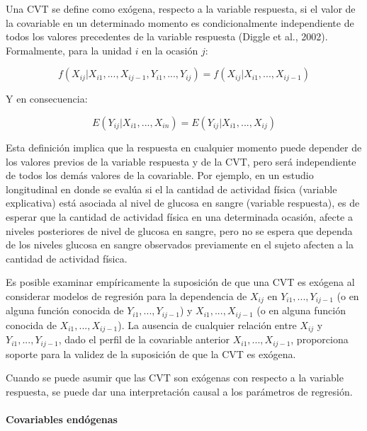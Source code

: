 \documentclass[spanish]{article}
\numberwithin{figure}{subsection}
\numberwithin{equation}{subsection}
\numberwithin{table}{subsection}
\begin{document}
Una CVT se define como exógena, respecto a la variable respuesta, si el valor de
la covariable en un determinado momento es condicionalmente independiente de
todos los valores precedentes de la variable respuesta (Diggle et al., 2002).
Formalmente, para la unidad $i$ en la ocasión $j$:  

\begin{equation}
	\label{exogeneidad}
	f(X_{ij}|X_{i1}, ..., X_{ij-1}, Y_{i1}, ..., Y_{ij}) =
	f(X_{ij}|X_{i1}, ..., X_{ij-1})
\end{equation}

Y en consecuencia:

\begin{equation}
	\label{exogeneidad debil}
	E(Y_{ij}|X_{i1}, ..., X_{in}) = E(Y_{ij}|X_{i1}, ..., X_{ij})
\end{equation}

Esta definición implica que la respuesta en cualquier momento puede depender de
los valores previos de la variable respuesta y de la CVT, pero será
independiente de todos los demás valores de la covariable. Por ejemplo, en un
estudio longitudinal en donde se evalúa si el la cantidad de actividad física
(variable explicativa) está asociada al nivel de glucosa en sangre (variable
respuesta), es de esperar que la cantidad de actividad física en una determinada
ocasión, afecte a niveles posteriores de nivel de glucosa en sangre, pero no se
espera que dependa de los niveles glucosa en sangre observados previamente en el
sujeto afecten a la cantidad de actividad física.

Es posible examinar empíricamente la suposición de que una CVT es exógena al
considerar modelos de regresión para la dependencia de $X_{ij}$ en
$Y_{i1}, ..., Y_{ij-1}$ (o en alguna función conocida de
$Y_{i1}, ..., Y_{ij-1}$) y $X_{i1}, ..., X_{ij-1}$ (o en alguna función conocida
de $X_{i1}, ..., X_{ij-1}$). La ausencia de cualquier relación entre $X_{ij}$ y
$Y_{i1}, ..., Y_{ij-1}$, dado el perfil de la covariable anterior
$X_{i1}, ..., X_{ij-1}$, proporciona soporte para la validez de la suposición de
que la CVT es exógena.

Cuando se puede asumir que las CVT son exógenas con respecto a la variable
respuesta, se puede dar una interpretación causal a los parámetros de regresión.

\paragraph{Covariables endógenas} \mbox{} \\
\end{document}
